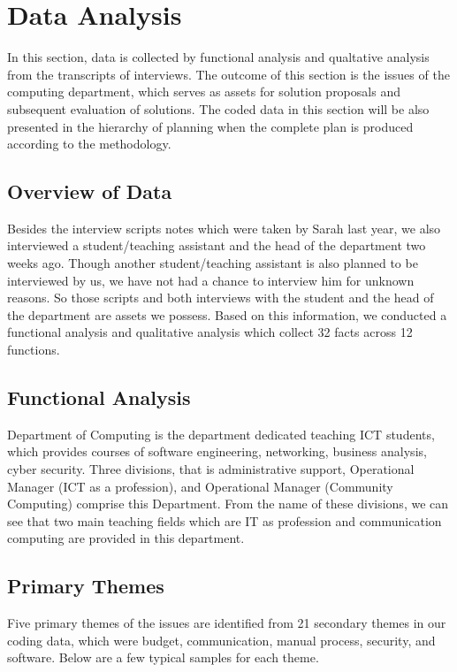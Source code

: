 
\section{Data Analysis}

In this section, data is collected by functional analysis and qualtative analysis from the transcripts of interviews. The outcome of this section is the issues of the computing department, which serves as assets for solution proposals and subsequent evaluation of solutions. The coded data in this section will be also presented in the hierarchy of planning when the complete plan is produced according to the methodology.

\subsection{Overview of Data}

Besides the interview scripts notes which were taken by Sarah last year, we also interviewed a student/teaching assistant and the head of the department two weeks ago. Though another student/teaching assistant is also planned to be interviewed by us, we have not had a chance to interview him for unknown reasons. So those scripts and both interviews with the student and the head of the department are assets we possess. Based on this information, we conducted a functional analysis and qualitative analysis which collect 32 facts across 12 functions.

\subsection{Functional Analysis}

Department of Computing is the department dedicated teaching ICT students, which provides courses of software engineering, networking, business analysis, cyber security. Three divisions, that is administrative support, Operational Manager (ICT as a profession), and Operational Manager (Community Computing) comprise this Department. From the name of these divisions, we can see that two main teaching fields which are IT as profession and communication computing are provided in this department.

\subsection{Primary Themes}
Five primary themes of the issues are identified from 21 secondary themes in our coding data, which were budget, communication, manual process, security, and software. Below are a few typical samples for each theme.

